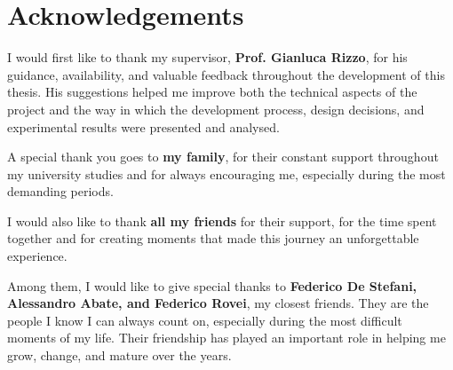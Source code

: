 \documentclass[a4paper,10pt,titlepage,twoside]{book}
\numberwithin{equation}{chapter}
\theoremstyle{plain}
\theoremstyle{definition}
\begin{document}
\mainmatter


















\chapter*{Acknowledgements}
{}

I would first like to thank my supervisor, \textbf{Prof. Gianluca Rizzo}, for his guidance,
availability, and valuable feedback throughout the development of this thesis. His
suggestions helped me improve both the technical aspects of the project and the way in
which the development process, design decisions, and experimental results were presented
and analysed.

\medskip

A special thank you goes to \textbf{my family}, for their constant support throughout my
university studies and for always encouraging me, especially during the most demanding
periods.

\medskip

I would also like to thank \textbf{all my friends} for their support, for the time spent
together and for creating moments that made this journey an unforgettable experience.

\medskip

Among them, I would like to give special thanks to \textbf{Federico De Stefani,
Alessandro Abate, and Federico Rovei}, my closest friends. They are the people I know I
can always count on, especially during the most difficult moments of my life. Their
friendship has played an important role in helping me grow, change, and mature over the
years.
\end{document}
